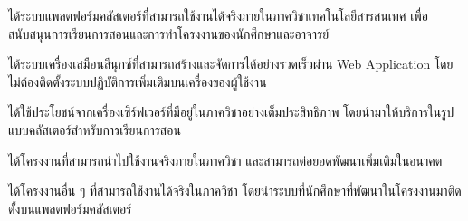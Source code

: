 \begin{mycustomenum}[label=1.4.\arabic*] %
    \item ได้ระบบแพลตฟอร์มคลัสเตอร์ที่สามารถใช้งานได้จริงภายในภาควิชาเทคโนโลยีสารสนเทศ เพื่อสนับสนุนการเรียนการสอนและการทำโครงงานของนักศึกษาและอาจารย์
    \item ได้ระบบเครื่องเสมือนลีนุกซ์ที่สามารถสร้างและจัดการได้อย่างรวดเร็วผ่าน Web Application โดยไม่ต้องติดตั้งระบบปฏิบัติการเพิ่มเติมบนเครื่องของผู้ใช้งาน
    \newpage
    \item ได้ใช้ประโยชน์จากเครื่องเซิร์ฟเวอร์ที่มีอยู่ในภาควิชาอย่างเต็มประสิทธิภาพ โดยนำมาให้บริการในรูปแบบคลัสเตอร์สำหรับการเรียนการสอน
    \item ได้โครงงานที่สามารถนำไปใช้งานจริงภายในภาควิชา และสามารถต่อยอดพัฒนาเพิ่มเติมในอนาคต
    \item ได้โครงงานอื่น ๆ ที่สามารถใช้งานได้จริงในภาควิชา โดยนำระบบที่นักศึกษาที่พัฒนาในโครงงานมาติดตั้งบนแพลตฟอร์มคลัสเตอร์
\end{mycustomenum}

